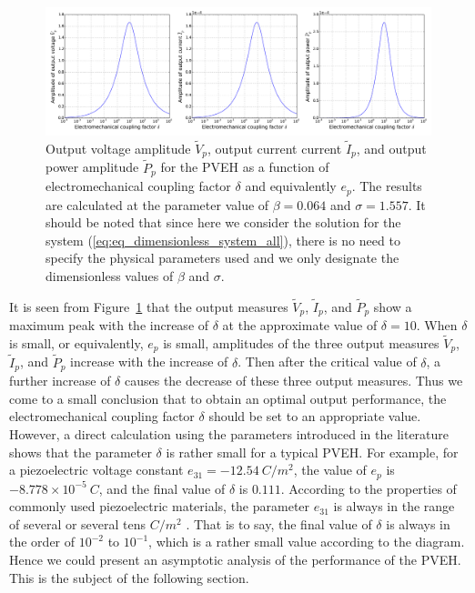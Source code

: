 \documentclass{svjour3}                     %
\begin{document}
\begin{figure}[!htbp]
    \centering
    \includegraphics[width=\textwidth]{./img_eig_asy/fig_sol_analytic_perf_fun}
    \caption{Output voltage amplitude $\tilde{V}_p$, output current current $\tilde{I}_p$, and output power amplitude $\tilde{P}_p$ for the PVEH as a function of electromechanical coupling factor $\delta$ and equivalently $e_p$. The results are calculated at the parameter value of $\beta = 0.064$ and $\sigma = 1.557$. It should be noted that since here we consider the solution for the system (\ref{eq:eq_dimensionless_system_all}), there is no need to specify the physical parameters used and we only designate the dimensionless values of $\beta $ and $\sigma $.}
    \label{fig:fig_sol_analytic_perf_fun}
\end{figure}


It is seen from Figure~\ref{fig:fig_sol_analytic_perf_fun} that the output measures $\tilde{V}_p$, $\tilde{I}_p$, and $\tilde{P}_p$ show a maximum peak with the increase of $\delta$ at the approximate value of $\delta = 10$. When $\delta$ is small, or equivalently, $e_p$ is small, amplitudes of the three output measures $\tilde{V}_p$, $\tilde{I}_p$, and $\tilde{P}_p$ increase with the increase of $\delta$. Then after the critical value of $\delta$, a further increase of $\delta$ causes the decrease of these three output measures. Thus we come to a small conclusion that to obtain an optimal output performance, the electromechanical coupling factor $\delta$ should be set to an appropriate value. However, a direct calculation using the parameters introduced in the literature \cite{erturk2008distributed,erturk2009experimentally} shows that the parameter $\delta$ is rather small for a typical PVEH. For example, for a piezoelectric voltage constant $e_{31} = -12.54\ C / m^2$, the value of $e_p$ is $-8.778 \times 10^{-5}\ C$, and the final value of $\delta$ is $0.111$. According to the properties of commonly used piezoelectric materials, the parameter $e_{31}$ is always in the range of several or several tens $C / m^2$ \cite{erturk2011piezoelectric}. That is to say, the final value of $\delta$ is always in the order of $10^{-2}$ to $10^{-1}$, which is a rather small value according to the diagram. Hence we could present an asymptotic analysis of the performance of the PVEH. This is the subject of the following section.
\end{document}
